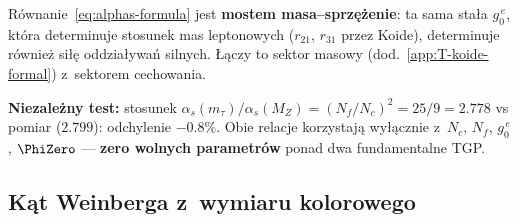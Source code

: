 \begin{remark}\label{rem:mass-coupling-bridge}
R\'ownanie~\eqref{eq:alphas-formula} jest \textbf{mostem
masa--sprz\k{e}\.zenie}: ta sama sta\l{}a $g_0^{\,e}$, kt\'ora
determinuje stosunek mas leptonowych ($r_{21}$, $r_{31}$ przez Koide),
determinuje r\'ownie\.z si\l{}\k{e} oddzia\l{}ywa\'n silnych.
\L{}\k{a}czy to sektor masowy (dod.~\ref{app:T-koide-formal})
z~sektorem cechowania.

\medskip\noindent\textbf{Niezale\.zny test:}
stosunek $\alpha_s(m_\tau)/\alpha_s(M_Z) = (N_f/N_c)^2 = 25/9 = 2.778$
vs pomiar ($2.799$): odchylenie $-0.8\%$.
Obie relacje korzystaj\k{a} wy\l{}\k{a}cznie z~$N_c$, $N_f$,
$g_0^{\,e}$, $\PhiZero$ --- \textbf{zero wolnych parametr\'ow}
ponad dwa fundamentalne TGP.
\end{remark}

\subsection{K\k{a}t Weinberga z~wymiaru kolorowego}%
\label{ssec:sin2thetaW}


